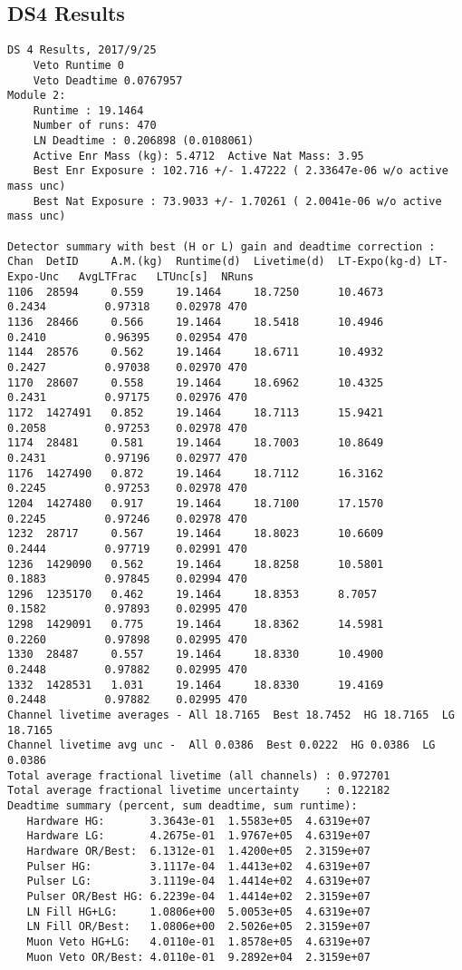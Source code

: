 \documentclass[notitlepage,rmp,aps,10pt]{revtex4-1}
\begin{document}
\subsection{DS4 Results}
\begin{verbatim}
DS 4 Results, 2017/9/25
	Veto Runtime 0
	Veto Deadtime 0.0767957
Module 2:
	Runtime : 19.1464
	Number of runs: 470
	LN Deadtime : 0.206898 (0.0108061)
	Active Enr Mass (kg): 5.4712  Active Nat Mass: 3.95
	Best Enr Exposure : 102.716 +/- 1.47222 ( 2.33647e-06 w/o active mass unc)
	Best Nat Exposure : 73.9033 +/- 1.70261 ( 2.0041e-06 w/o active mass unc)

Detector summary with best (H or L) gain and deadtime correction :
Chan  DetID     A.M.(kg)  Runtime(d)  Livetime(d)  LT-Expo(kg-d) LT-Expo-Unc   AvgLTFrac   LTUnc[s]  NRuns
1106  28594     0.559     19.1464     18.7250      10.4673        0.2434         0.97318    0.02978 470
1136  28466     0.566     19.1464     18.5418      10.4946        0.2410         0.96395    0.02954 470
1144  28576     0.562     19.1464     18.6711      10.4932        0.2427         0.97038    0.02970 470
1170  28607     0.558     19.1464     18.6962      10.4325        0.2431         0.97175    0.02976 470
1172  1427491   0.852     19.1464     18.7113      15.9421        0.2058         0.97253    0.02978 470
1174  28481     0.581     19.1464     18.7003      10.8649        0.2431         0.97196    0.02977 470
1176  1427490   0.872     19.1464     18.7112      16.3162        0.2245         0.97253    0.02978 470
1204  1427480   0.917     19.1464     18.7100      17.1570        0.2245         0.97246    0.02978 470
1232  28717     0.567     19.1464     18.8023      10.6609        0.2444         0.97719    0.02991 470
1236  1429090   0.562     19.1464     18.8258      10.5801        0.1883         0.97845    0.02994 470
1296  1235170   0.462     19.1464     18.8353      8.7057         0.1582         0.97893    0.02995 470
1298  1429091   0.775     19.1464     18.8362      14.5981        0.2260         0.97898    0.02995 470
1330  28487     0.557     19.1464     18.8330      10.4900        0.2448         0.97882    0.02995 470
1332  1428531   1.031     19.1464     18.8330      19.4169        0.2448         0.97882    0.02995 470
Channel livetime averages - All 18.7165  Best 18.7452  HG 18.7165  LG 18.7165
Channel livetime avg unc -  All 0.0386  Best 0.0222  HG 0.0386  LG 0.0386
Total average fractional livetime (all channels) : 0.972701
Total average fractional livetime uncertainty    : 0.122182
Deadtime summary (percent, sum deadtime, sum runtime):
   Hardware HG:       3.3643e-01  1.5583e+05  4.6319e+07
   Hardware LG:       4.2675e-01  1.9767e+05  4.6319e+07
   Hardware OR/Best:  6.1312e-01  1.4200e+05  2.3159e+07
   Pulser HG:         3.1117e-04  1.4413e+02  4.6319e+07
   Pulser LG:         3.1119e-04  1.4414e+02  4.6319e+07
   Pulser OR/Best HG: 6.2239e-04  1.4414e+02  2.3159e+07
   LN Fill HG+LG:     1.0806e+00  5.0053e+05  4.6319e+07
   LN Fill OR/Best:   1.0806e+00  2.5026e+05  2.3159e+07
   Muon Veto HG+LG:   4.0110e-01  1.8578e+05  4.6319e+07
   Muon Veto OR/Best: 4.0110e-01  9.2892e+04  2.3159e+07


\end{verbatim}
\end{document}
